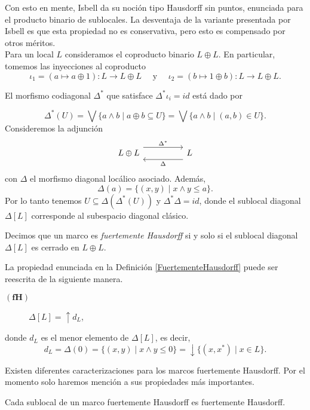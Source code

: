 Con esto en mente, Isbell da su noción tipo Hausdorff sin puntos, enunciada para el producto binario de sublocales. La desventaja de la variante presentada por Isbell es que esta propiedad no es conservativa, pero esto es compensado por otros méritos.\\

Para un local $L$ consideramos el coproducto binario $L\oplus L$. En particular, tomemos las inyecciones al coproducto
\[
\iota_1=(a\mapsto a\oplus 1)\colon L\to L\oplus L\quad \mbox{ y }\quad \iota_2=(b\mapsto 1\oplus b)\colon L\to L\oplus L.
\]

El morfismo codiagonal $\Delta^*$ que satisface $\Delta^*\iota_i=id$ está dado por

\[
\Delta^*(U)=\bigvee\{a\wedge b\mid a\oplus b\subseteq U\}=\bigvee\{a\wedge b\mid (a, b)\in U\}. 
\]
Consideremos la adjunción
\[\begin{tikzcd}
	{L\oplus L} && L
	\arrow["{\Delta^*}", shift left=3, from=1-1, to=1-3]
	\arrow["\Delta", shift left=3, from=1-3, to=1-1]
\end{tikzcd}\]
con $\Delta$ el morfismo diagonal locálico asociado. Además, 
\[
\Delta(a)=\{(x, y)\mid x\wedge y\leq a\}.
\]
Por lo tanto tenemos $U\subseteq \Delta(\Delta^*(U))$ y $\Delta^*\Delta=id$, donde el sublocal diagonal $\Delta[L]$ corresponde al subespacio diagonal clásico.

\begin{dfn}\label{FuertementeHausdorff}
    Decimos que un marco es \emph{fuertemente Hausdorff} si y solo si el sublocal diagonal $\Delta[L]$ es cerrado en $L\oplus L$.
\end{dfn}

La propiedad enunciada en la Definición \ref{FuertementeHausdorff} puede ser reescrita de la siguiente manera.

\begin{description}
    \item[$\mathbf{(fH)}$] $\Delta[L]=\uparrow d_L$, 
\end{description}
donde $d_L$ es el menor elemento de $\Delta[L]$, es decir,
\[
d_L=\Delta(0)=\{(x, y)\mid x\wedge y\leq 0\}=\downarrow\{(x, x^*)\mid x\in L\}.
\]

Existen diferentes caracterizaciones para los marcos fuertemente Hausdorff. Por el momento solo haremos mención a sus propiedades más importantes.

\begin{prop}\label{Proposicion5.3.4}
    Cada sublocal de un marco fuertemente Hausdorff es fuertemente Hausdorff.
\end{prop}


